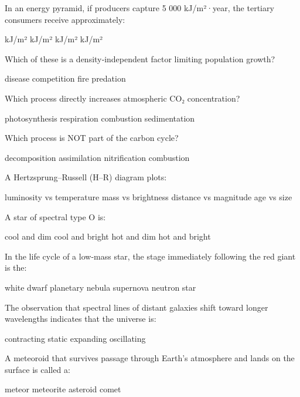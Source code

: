\documentclass[12pt,letterpaper]{exam}
\begin{document}
\begin{questions}
\question[1] In an energy pyramid, if producers capture 5 000 kJ/m²·year, the tertiary consumers receive approximately:    
\begin{oneparchoices}  
   kJ/m²  
   kJ/m²  
   kJ/m²  
   kJ/m²  
\end{oneparchoices}  
  
\question[1] Which of these is a density‐independent factor limiting population growth?    
\begin{oneparchoices}  
  \choice disease  
  \choice competition  
  \choice fire  
  \choice predation  
\end{oneparchoices}  
  
\question[1] Which process directly increases atmospheric CO₂ concentration?    
\begin{oneparchoices}  
  \choice photosynthesis  
  \choice respiration  
  \choice combustion  
  \choice sedimentation  
\end{oneparchoices}  
  
\question[1] Which process is NOT part of the carbon cycle?    
\begin{oneparchoices}  
  \choice decomposition  
  \choice assimilation  
  \choice nitrification  
  \choice combustion  
\end{oneparchoices}  
  
\question[1] A Hertzsprung–Russell (H–R) diagram plots:    
\begin{oneparchoices}  
  \choice luminosity vs temperature  
  \choice mass vs brightness  
  \choice distance vs magnitude  
  \choice age vs size  
\end{oneparchoices}  
  
\question[1] A star of spectral type O is:    
\begin{oneparchoices}  
  \choice cool and dim  
  \choice cool and bright  
  \choice hot and dim  
  \choice hot and bright  
\end{oneparchoices}  
  
\question[1] In the life cycle of a low‐mass star, the stage immediately following the red giant is the:    
\begin{oneparchoices}  
  \choice white dwarf  
  \choice planetary nebula  
  \choice supernova  
  \choice neutron star  
\end{oneparchoices}  
  
\question[1] The observation that spectral lines of distant galaxies shift toward longer wavelengths indicates that the universe is:    
\begin{oneparchoices}  
  \choice contracting  
  \choice static  
  \choice expanding  
  \choice oscillating  
\end{oneparchoices}  
  
\question[1] A meteoroid that survives passage through Earth's atmosphere and lands on the surface is called a:    
\begin{oneparchoices}  
  \choice meteor  
  \choice meteorite  
  \choice asteroid  
  \choice comet  
\end{oneparchoices}  
  
\end{questions}  
  
\end{document}

